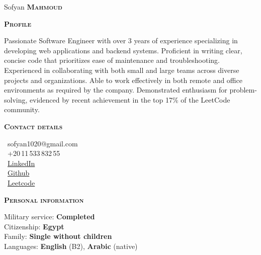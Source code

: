 \documentclass[11pt, a4paper]{article}
\newcommand{\headleft}[1]{\vspace*{3ex}\textsc{\textbf{#1}}\par%
    \vspace*{-1.5ex}\hrulefill\par\vspace*{0.7ex}}
\begin{document}
\setlength{\topskip}{0pt}
\setlength{\parindent}{0pt}
\setlength{\parskip}{0pt}
\setlength{\fboxsep}{0pt}
\pagestyle{empty}
\raggedbottom

\begin{minipage}[t]{0.33\textwidth} %
\colorbox{secondColor}{\begin{minipage}[t][5mm][t]{\textwidth}\null\hfill\null\end{minipage}}

\vspace{-.2ex} %
\colorbox{secondColor!90}{\color{white}  %
\textwidth\relax%
\begin{minipage}[t][293mm][t]{0.82\textwidth}
\raggedright
\vspace*{2.5ex}

\Large \centerline{Sofyan \textbf{\textsc{Mahmoud}}} \normalsize 


\vspace*{0.5ex} %

\headleft{Profile}
Passionate Software Engineer with over 3 years of experience specializing in developing web applications and backend systems. 
Proficient in writing clear, concise code that prioritizes ease of maintenance and troubleshooting. 
Experienced in collaborating with both small and large teams across diverse projects and organizations. 
Able to work effectively in both remote and office environments as required by the company. 
Demonstrated enthusiasm for problem-solving, evidenced by recent achievement in the top 17\% of the LeetCode community.

\headleft{Contact details}
\small %
\Letter\ {\small sofyan1020@gmail.com} \\[0.4ex]
\faMobile\ +20\,11\,533\,832\,55 \\[0.5ex]
\faLinkedin\ \href{https://www.linkedin.com/in/sofyanmahmoud0000/}{LinkedIn} \\[0.1ex]
\faGithub\ \href{https://github.com/sofyanmahmoud0000}{Github} \\[0.1ex]
\faAt\ \href{https://leetcode.com/sofyan1020/}{Leetcode} \\[0.1ex]
\normalsize

\headleft{Personal information}
Military service: \textbf{Completed} \\
Citizenship: \textbf{Egypt} \\[0.5ex]
Family: \textbf{Single without children} \\[0.5ex]
Languages: \textbf{English} (B2), \textbf{Arabic} (native)

\end{minipage}%
\textwidth\relax%
}
\end{minipage}%
\end{document}
